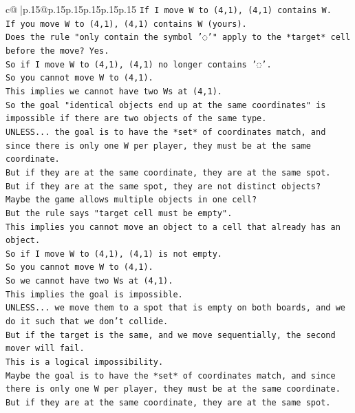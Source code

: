 \documentclass{article}
\begin{document}
{\begin{supertabular}{c@{$\;$}|p{.15\linewidth}@{}p{.15\linewidth}p{.15\linewidth}p{.15\linewidth}p{.15\linewidth}p{.15\linewidth}}
{{{\texttt{If I move W to (4,1), (4,1) contains W.} \\
\texttt{If you move W to (4,1), (4,1) contains W (yours).} \\
\texttt{Does the rule "only contain the symbol '◌'" apply to the *target* cell before the move? Yes.} \\
\texttt{So if I move W to (4,1), (4,1) no longer contains '◌'.} \\
\texttt{So you cannot move W to (4,1).} \\
\texttt{This implies we cannot have two Ws at (4,1).} \\
\texttt{So the goal "identical objects end up at the same coordinates" is impossible if there are two objects of the same type.} \\
\texttt{UNLESS... the goal is to have the *set* of coordinates match, and since there is only one W per player, they must be at the same coordinate.} \\
\texttt{But if they are at the same coordinate, they are at the same spot.} \\
\texttt{But if they are at the same spot, they are not distinct objects?} \\
\texttt{Maybe the game allows multiple objects in one cell?} \\
\texttt{But the rule says "target cell must be empty".} \\
\texttt{This implies you cannot move an object to a cell that already has an object.} \\
\texttt{So if I move W to (4,1), (4,1) is not empty.} \\
\texttt{So you cannot move W to (4,1).} \\
\texttt{So we cannot have two Ws at (4,1).} \\
\texttt{This implies the goal is impossible.} \\
\texttt{UNLESS... we move them to a spot that is empty on both boards, and we do it such that we don't collide.} \\
\texttt{But if the target is the same, and we move sequentially, the second mover will fail.} \\
\texttt{This is a logical impossibility.} \\
\texttt{Maybe the goal is to have the *set* of coordinates match, and since there is only one W per player, they must be at the same coordinate.} \\
\texttt{But if they are at the same coordinate, they are at the same spot.} \\
}}}
\end{supertabular}}
\end{document}
